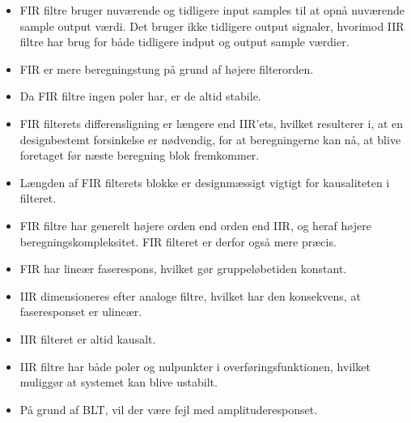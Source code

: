 \begin{itemize}
	\item FIR filtre bruger nuværende og tidligere input samples til at opnå nuværende sample output værdi. Det bruger ikke tidligere output signaler, hvorimod IIR filtre har brug for både tidligere indput og output sample værdier.
	\item FIR er mere beregningstung på grund af højere filterorden.
	\item Da FIR filtre ingen poler har, er de altid stabile.
	\item FIR filterets differensligning er længere end IIR'ets, hvilket resulterer i, at en designbestemt forsinkelse er nødvendig, for at beregningerne kan nå, at blive foretaget før næste beregning blok fremkommer.
	\item Længden af FIR filterets blokke er designmæssigt vigtigt for kausaliteten i filteret.
	\item FIR filtre har generelt højere orden end orden end IIR, og heraf højere beregningskompleksitet. FIR filteret er derfor også mere præcis.	
	\item FIR har lineær faserespons, hvilket gør gruppeløbetiden konstant.
	\item IIR dimensioneres efter analoge filtre, hvilket har den konsekvens, at faseresponset er ulineær.
	\item IIR filteret er altid kausalt.
	\item IIR filtre har både poler og nulpunkter i overføringsfunktionen, hvilket muliggør at systemet kan blive ustabilt.
	\item På grund af BLT, vil der være fejl med amplituderesponset.
\end{itemize}




